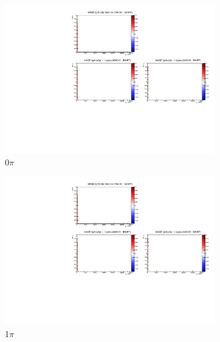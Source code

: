 \begin{figure}[h]
	\begin{subfigure}[t]{0.32\textwidth}
		\includegraphics[width=\textwidth, trim={5mm 70mm 100mm 7mm}, clip, page=8]{figures/mach3/banff/momentumProjections_170328_withMACH3_MAQEonly}
		\caption{0$\pi$}
	\end{subfigure}
	\begin{subfigure}[t]{0.32\textwidth}
		\includegraphics[width=\textwidth, trim={5mm 70mm 100mm 7mm}, clip, page=9]{figures/mach3/banff/momentumProjections_170328_withMACH3_MAQEonly}
		\caption{1$\pi$}
	\end{subfigure}
	\begin{subfigure}[t]{0.32\textwidth}

\end{subfigure}
\end{figure}
